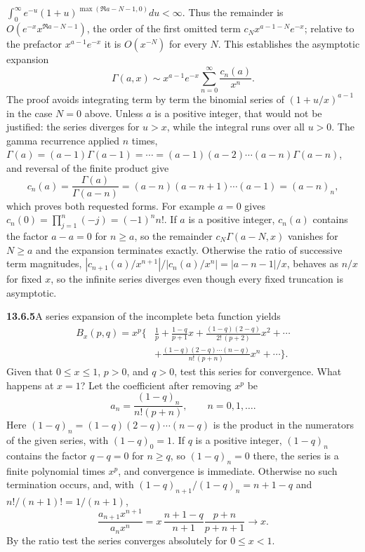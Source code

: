 $\int_0^\infty e^{-u}(1+u)^{\max(\Re a-N-1,0)}du<\infty$.
Thus the remainder is $O(e^{-x}x^{\Re a-N-1})$, the order of the
first omitted term $c_Nx^{a-1-N}e^{-x}$; relative to the prefactor
$x^{a-1}e^{-x}$ it is $O(x^{-N})$ for every $N$.  This establishes
the asymptotic expansion
\[
\boxed{\Gamma(a,x)\sim x^{a-1}e^{-x}
\sum_{n=0}^{\infty}\frac{c_n(a)}{x^n}}.
\]
The proof avoids integrating term by term the binomial series of
$(1+u/x)^{a-1}$ in the case $N=0$ above.  Unless $a$ is a positive
integer, that would not be justified: the series diverges for
$u>x$, while the integral runs over all $u>0$.
The gamma recurrence applied $n$ times,
$\Gamma(a)=(a-1)\Gamma(a-1)=\cdots=(a-1)(a-2)\cdots(a-n)\Gamma(a-n)$,
and reversal of the finite product give
\[
c_n(a)=\frac{\Gamma(a)}{\Gamma(a-n)}
=(a-n)(a-n+1)\cdots(a-1)=(a-n)_n,
\]
which proves both requested forms.
For example $a=0$ gives $c_n(0)=\prod_{j=1}^n(-j)=(-1)^nn!$.  If $a$ is a
positive integer, $c_n(a)$ contains the factor $a-a=0$ for
$n\ge a$, so the remainder $c_N\Gamma(a-N,x)$ vanishes for
$N\ge a$ and the expansion terminates exactly.  Otherwise the
ratio of successive term magnitudes,
$|c_{n+1}(a)/x^{n+1}|/|c_n(a)/x^n|=|a-n-1|/x$, behaves as $n/x$
for fixed $x$, so the infinite series diverges even though every
fixed truncation is asymptotic.


\par\bigskip
\noindent\textbf{13.6.5}\quad A series expansion of the incomplete beta
function yields
\begin{align*}
B_{x}(p,q)=x^{p}\Bigg\{&\frac{1}{p}+\frac{1-q}{p+1}x
+\frac{(1-q)(2-q)}{2!\,(p+2)}x^{2}+\cdots\\
&+\frac{(1-q)(2-q)\cdots(n-q)}{n!\,(p+n)}x^{n}+\cdots\Bigg\}.
\end{align*}
Given that $0\le x\le1$, $p>0$, and $q>0$, test this series for convergence.
What happens at $x=1$?
\solution
Let the coefficient after removing $x^p$ be
\[
a_n=\frac{(1-q)_n}{n!(p+n)},\qquad n=0,1,\ldots.
\]
Here $(1-q)_n=(1-q)(2-q)\cdots(n-q)$ is the product in the
numerators of the given series, with $(1-q)_0=1$.
If $q$ is a positive integer, $(1-q)_n$ contains the factor
$q-q=0$ for $n\ge q$, so $(1-q)_n=0$ there,
the series is a finite polynomial times $x^p$, and convergence
is immediate.  Otherwise no such termination occurs, and, with
$(1-q)_{n+1}/(1-q)_n=n+1-q$ and $n!/(n+1)!=1/(n+1)$,
\[
\frac{a_{n+1}x^{n+1}}{a_nx^n}
=x\,\frac{n+1-q}{n+1}\frac{p+n}{p+n+1}\longrightarrow x.
\]
By the ratio test the series converges absolutely for $0\le x<1$.

